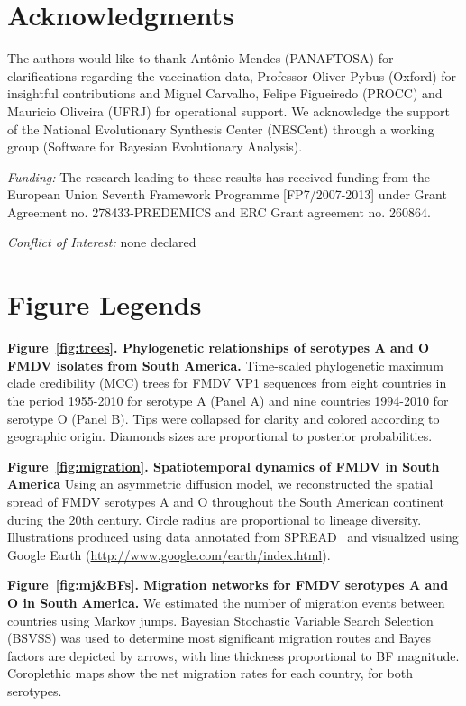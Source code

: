 \documentclass[10pt]{article}
\begin{document}
\section*{Acknowledgments}
The authors would like to thank Ant\^onio Mendes (PANAFTOSA) for clarifications regarding the vaccination data, Professor Oliver Pybus (Oxford) for insightful contributions and Miguel Carvalho, Felipe Figueiredo (PROCC) and Mauricio Oliveira (UFRJ) for operational support.
We acknowledge the support of the National Evolutionary Synthesis Center (NESCent) through a working group (Software for Bayesian Evolutionary Analysis).

\emph{Funding:} The research leading to these results has received funding from the European Union Seventh Framework Programme [FP7/2007-2013] under Grant Agreement no. 278433-PREDEMICS and ERC Grant agreement no. 260864.

\emph{Conflict of Interest:} none declared

\newpage

\newpage
\section*{Figure Legends}
{\bf Figure~\ref{fig:trees}. Phylogenetic relationships of serotypes A and O FMDV isolates from South America.} Time-scaled phylogenetic maximum clade credibility (MCC) trees for FMDV VP1 sequences from eight countries in the period 1955-2010 for serotype A (Panel A) and nine countries 1994-2010 for serotype O (Panel B).
Tips were collapsed for clarity and colored according to geographic origin.
Diamonds sizes are proportional to posterior probabilities.

{\bf Figure~\ref{fig:migration}. Spatiotemporal dynamics of FMDV in South America} Using an asymmetric diffusion model, we reconstructed the spatial spread of FMDV serotypes A and O throughout the South American continent during the 20th century.
Circle radius are proportional to lineage diversity.
Illustrations produced using data annotated from SPREAD~\cite{spread} and visualized using Google Earth (\url{http://www.google.com/earth/index.html}).

{\bf Figure~\ref{fig:mj&BFs}. Migration networks for FMDV serotypes A and O in South America.} We estimated the number of migration events between countries using Markov jumps.
Bayesian Stochastic Variable Search Selection (BSVSS) was used to determine most significant migration routes and Bayes factors are depicted by arrows, with line thickness proportional to BF magnitude.
Coroplethic maps show the net migration rates for each country, for both serotypes.
\end{document}
